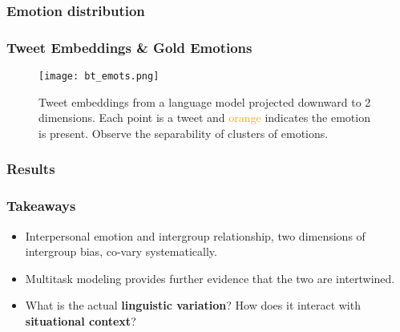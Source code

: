 \begin{frame}[c]\frametitle{Emotion distribution}

   \pause
    
    \begin{figure}
        
        \label{fig:emot-dist}
    \end{figure}

\end{frame}


\begin{frame}[c]\frametitle{Tweet Embeddings \& Gold Emotions}
    
    \pause
    
    \begin{figure}
        \texttt{[image: bt\_emots.png]}
        \caption{\small Tweet embeddings from a language model projected downward to 2 dimensions. Each point is a tweet and \textcolor{orange}{orange} indicates the emotion is present. Observe the separability of clusters of emotions.}
        \label{fig:emots_bt}
    \end{figure}
    \nocite{sainburg2021parametric}
    
\end{frame}

\begin{frame}[c]\frametitle{Results}
    
\end{frame}


\begin{frame}[c]\frametitle{Takeaways}

    \begin{itemize}
      \itemsep=\baselineskip
       \item Interpersonal emotion and intergroup relationship, two dimensions of intergroup bias, co-vary systematically.\pause
       \item Multitask modeling provides further evidence that the two are intertwined.\pause
      \item What is the actual \textbf{linguistic variation}? How does it interact with \textbf{situational context}? 
    \end{itemize}

\end{frame}
